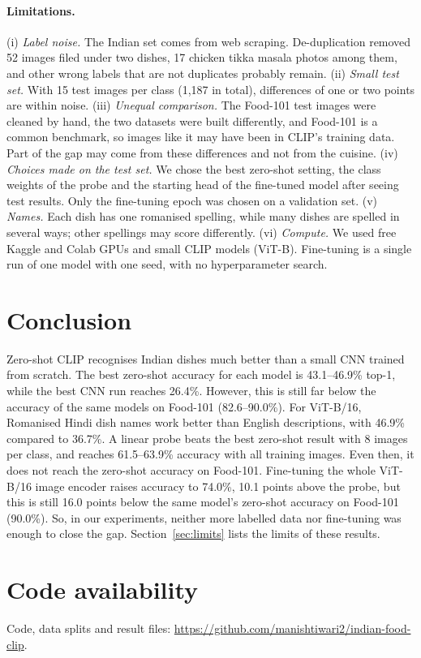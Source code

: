 \documentclass[twoside,a4paper,11pt]{article}
\begin{document}
\paragraph{Limitations.} (i) \emph{Label noise.} The Indian set comes from web scraping. De-duplication removed 52
images filed under two dishes, 17 chicken tikka masala photos among them, and other wrong labels that are not
duplicates probably remain. (ii) \emph{Small test set.} With 15 test images per
class (1{,}187 in total), differences of one or two points are within noise. (iii) \emph{Unequal comparison.} The
Food-101 test images were cleaned by hand, the two datasets were built differently, and Food-101 is a common
benchmark, so images like it may have been in CLIP's training data. Part of the gap may come from these differences
and not from the cuisine. (iv) \emph{Choices made on the test set.} We chose the best zero-shot setting, the class
weights of the probe and the starting head of the fine-tuned model after seeing test results. Only the fine-tuning
epoch was chosen on a validation set. (v) \emph{Names.} Each dish has one romanised spelling, while many dishes are
spelled in several ways; other spellings may score differently. (vi) \emph{Compute.} We used free Kaggle and Colab
GPUs and small CLIP models (ViT-B). Fine-tuning is a single run of one model with one seed, with no hyperparameter
search.

\section{Conclusion}               %
Zero-shot CLIP recognises Indian dishes much better than a small CNN trained from scratch. The best zero-shot accuracy for each model is 43.1--46.9\% top-1, while the best CNN run reaches 26.4\%. However, this is still far below the accuracy of the same models on Food-101 (82.6--90.0\%). For ViT-B/16, Romanised Hindi dish names work better than English descriptions, with 46.9\% compared to 36.7\%. A linear probe beats the best zero-shot result with 8 images per class, and reaches 61.5--63.9\% accuracy with all training images. Even then, it does not reach the zero-shot accuracy on Food-101. Fine-tuning the whole ViT-B/16 image encoder raises accuracy to 74.0\%, 10.1 points above the probe, but this is still 16.0 points below the same model's zero-shot accuracy on Food-101 (90.0\%). So, in our experiments, neither more labelled data nor fine-tuning was enough to close the gap. Section~\ref{sec:limits} lists the limits of these results.

\section*{Code availability}
Code, data splits and result files: \url{https://github.com/manishtiwari2/indian-food-clip}.

\small
\let\oldthebibliography\thebibliography
\renewcommand{\thebibliography}[1]{\oldthebibliography{#1}\setlength{\itemsep}{0pt}\setlength{\parskip}{0pt}}


\end{document}
